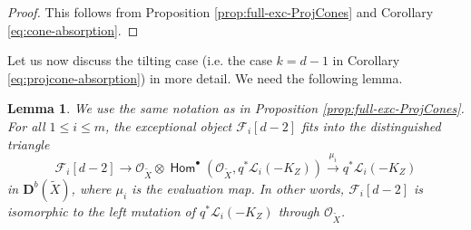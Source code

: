 \documentclass[a4paper,11pt, reqno]{amsart}
\def\DD{\mathbf D}
\def\OO{\mathcal O}
\def\sF{\mathscr{F}}
\def\sL{\mathscr{L}}
\newcommand{\opname}[1]{\operatorname{\mathsf{#1}}}
\newcommand{\Hom}{\opname{Hom}}
\def\Db{\DD^b}
\theoremstyle{plain}
\newtheorem{lemma}[dummy]{Lemma}
\theoremstyle{definition}
\numberwithin{equation}{section}
\newlength{\arrow}
\begin{document}
\begin{proof}
This follows from Proposition \ref{prop:full-exc-ProjCones} and Corollary \ref{eq:cone-absorption}.
 \end{proof}


Let us now discuss the tilting case (i.e. the case $k=d-1$ in Corollary \ref{eq:projcone-absorption}) in more detail.
We need the following lemma.

\begin{lemma}\label{lem:help}
We use the same notation as in Proposition \ref{prop:full-exc-ProjCones}.
For all $1\leq i \leq m$, the exceptional object $\sF_{i} [d-2]$ fits into the distinguished triangle 
\begin{equation}\label{eq:left-mutation}
    \sF_{i}[d-2] \to \OO_{\tilde{X}} \otimes \Hom^\bullet ( \OO_{\tilde{X}} , q^\ast \sL_i (-K_Z ) ) \xrightarrow{\mu_i} q^\ast \sL_i (-K_Z ) 
\end{equation}
    in $\Db( \tilde{X} )$,
    where $\mu_i$ is the evaluation map.
    In other words, $\sF_i [d-2]$ is isomorphic to the left mutation of $q^\ast \sL_i (-K_Z )$ through $\OO_{\tilde{X}}$.
\end{lemma}
\end{document}
